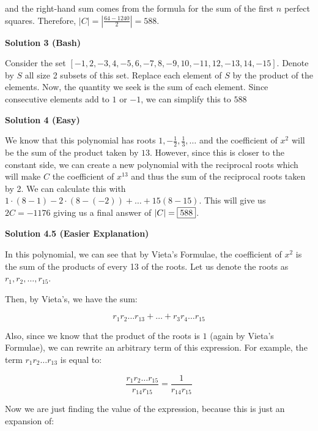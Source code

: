 \begin{enumerate}
 and the right-hand sum comes from the formula for the sum of the first $n$ perfect squares. Therefore, $|C| = \left|\frac{64-1240}{2}\right| = \boxed{588}$.

 



\textbf{Solution 3 (Bash)}

Consider the set $[-1, 2,-3,4,-5,6,-7,8,-9,10,-11,12,-13,14,-15]$. Denote by $S$ all size 2 subsets of this set. Replace each element of $S$ by the product of the elements. Now, the quantity we seek is the sum of each element. Since consecutive elements add to $1$ or $-1$, we can simplify this to $588$




\textbf{Solution 4 (Easy)}

We know that this polynomial has roots $1, -\frac{1}{2}, \frac{1}{3},\ldots$ and the coefficient of $x^2$ will be the sum of the product taken by $13$. However, since this is closer to the constant side, we can create a new polynomial with the reciprocal roots which will make $C$ the coefficient of $x^{13}$ and thus the sum of the reciprocal roots taken by 2. We can calculate this with $1\cdot(8-1)-2\cdot(8-(-2))+\ldots+15(8-15)$. This will give us $2C = -1176$ giving us a final answer of $|C| = \fbox{588}$.

 


 



\textbf{Solution 4.5 (Easier Explanation)}

In this polynomial, we can see that by Vieta’s Formulae, the coefficient of $x^2$ is the sum of the products of every 13 of the roots. Let us denote the roots as $r_1, r_2, \dots, r_{15}$.

 


 Then, by Vieta’s, we have the sum:

 
 \[r_1 r_2 \dots r_{13} + \dots + r_3 r_4 \dots r_{15}\]

 


 Also, since we know that the product of the roots is $1$ (again by Vieta’s Formulae), we can rewrite an arbitrary term of this expression. For example, the term $r_1 r_2 \dots r_{13}$ is equal to:

 
 \[\frac{r_1 r_2 \dots r_{15}}{r_{14} r_{15}} = \frac{1}{r_{14} r_{15}}\]

 


 Now we are just finding the value of the expression, because this is just an expansion of:


\end{enumerate}
